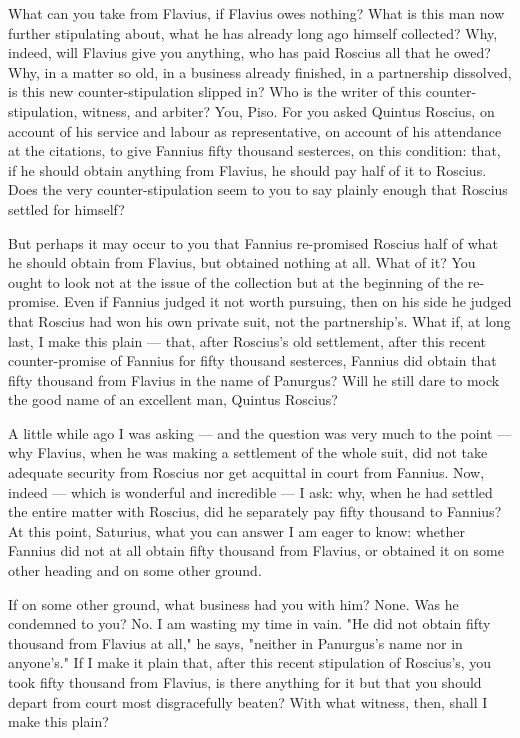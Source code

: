  What can you take from Flavius, if Flavius owes nothing? What is this man now further stipulating about, what he has already long ago himself collected? Why, indeed, will Flavius give you anything, who has paid Roscius all that he owed? Why, in a matter so old, in a business already finished, in a partnership dissolved, is this new counter-stipulation slipped in? Who is the writer of this counter-stipulation, witness, and arbiter? You, Piso. For you asked Quintus Roscius, on account of his service and labour as representative, on account of his attendance at the citations, to give Fannius fifty thousand sesterces, on this condition: that, if he should obtain anything from Flavius, he should pay half of it to Roscius. Does the very counter-stipulation seem to you to say plainly enough that Roscius settled for himself?

 But perhaps it may occur to you that Fannius re-promised Roscius half of what he should obtain from Flavius, but obtained nothing at all. What of it? You ought to look not at the issue of the collection but at the beginning of the re-promise. Even if Fannius judged it not worth pursuing, then on his side he judged that Roscius had won his own private suit, not the partnership's. What if, at long last, I make this plain --- that, after Roscius's old settlement, after this recent counter-promise of Fannius for fifty thousand sesterces, Fannius did obtain that fifty thousand from Flavius in the name of Panurgus? Will he still dare to mock the good name of an excellent man, Quintus Roscius?

 A little while ago I was asking --- and the question was very much to the point --- why Flavius, when he was making a settlement of the whole suit, did not take adequate security from Roscius nor get acquittal in court from Fannius. Now, indeed --- which is wonderful and incredible --- I ask: why, when he had settled the entire matter with Roscius, did he separately pay fifty thousand to Fannius? At this point, Saturius, what you can answer I am eager to know: whether Fannius did not at all obtain fifty thousand from Flavius, or obtained it on some other heading and on some other ground.

 If on some other ground, what business had you with him? None. Was he condemned to you? No. I am wasting my time in vain. "He did not obtain fifty thousand from Flavius at all," he says, "neither in Panurgus's name nor in anyone's." If I make it plain that, after this recent stipulation of Roscius's, you took fifty thousand from Flavius, is there anything for it but that you should depart from court most disgracefully beaten? With what witness, then, shall I make this plain?


